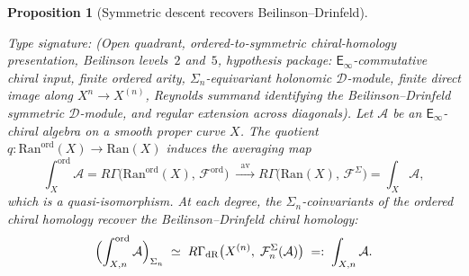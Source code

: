 \documentclass[11pt,reqno]{amsart}
\newtheorem{proposition}[theorem]{Proposition}
\theoremstyle{definition}
\theoremstyle{remark}
\newcommand{\cA}{\mathcal{A}}
\newcommand{\cD}{\mathcal{D}}
\newcommand{\cF}{\mathcal{F}}
\newcommand{\Ran}{\mathrm{Ran}}
\newcommand{\Einf}{\mathsf{E}_{\infty}}
\DeclareMathOperator{\av}{av}
\numberwithin{equation}{section}
\providecommand{\ClaimStatusConditional}{}
\begin{document}
\begin{proposition}[Symmetric descent recovers
Beilinson--Drinfeld]
\label{prop:sym-descent}
\ClaimStatusConditional
Type signature: \textup{(}Open quadrant, ordered-to-symmetric
chiral-homology presentation, Beilinson levels~$2$ and~$5$,
hypothesis package: \(\Einf\)-commutative chiral input, finite
ordered arity, \(\Sigma_n\)-equivariant holonomic \(\cD\)-module,
finite direct image along \(X^n\to X^{(n)}\), Reynolds summand
identifying the Beilinson--Drinfeld symmetric \(\cD\)-module, and
regular extension across diagonals\textup{)}.
Let $\cA$ be an $\Einf$-chiral algebra on a smooth
proper curve $X$. The quotient
$q \colon \Ran^{\mathrm{ord}}(X) \to \Ran(X)$
induces the averaging map
\begin{equation}\label{eq:sym-descent-ran}
  \int_X^{\mathrm{ord}} \cA
  = R\Gamma\bigl(\Ran^{\mathrm{ord}}(X),\,
  \cF^{\mathrm{ord}}\bigr)
  \;\xrightarrow{\;\;\av\;\;}
  R\Gamma\bigl(\Ran(X),\,
  \cF^{\Sigma}\bigr)
  = \int_X \cA,
\end{equation}
which is a quasi-isomorphism. At each degree, the
$\Sigma_n$-coinvariants of the ordered chiral homology
recover the Beilinson--Drinfeld chiral homology:
\begin{equation}\label{eq:sym-descent}
  \Bigl(\int_{X,n}^{\mathrm{ord}} \cA\Bigr)_{\Sigma_n}
  \;\simeq\;
  R\Gamma_{\mathrm{dR}}\bigl(X^{(n)},\;
  \cF_n^{\Sigma}(\cA)\bigr)
  \;=:\;
  \int_{X,n} \cA.
\end{equation}
\end{proposition}
\end{document}
